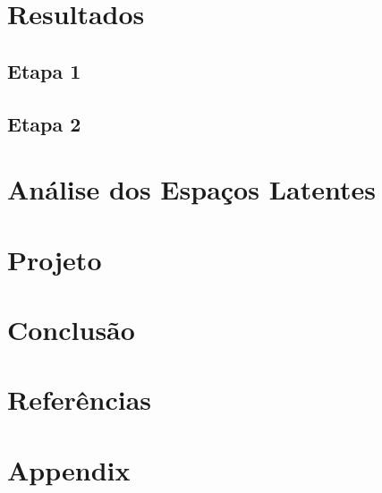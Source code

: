 \documentclass[12pt,a4paper]{report}
\renewcommand{\thesection}{\arabic{section}}
\begin{document}
\section{Resultados}

\subsection{Etapa 1}

\subsection{Etapa 2}


\section{Análise dos Espaços Latentes}


\section{Projeto}

\section{Conclusão}

\clearpage
\section{Referências}


\clearpage
\appendix
\renewcommand{\thesection}{\Alph{section}}
\setcounter{section}{0}
\section{Appendix}
\end{document}
